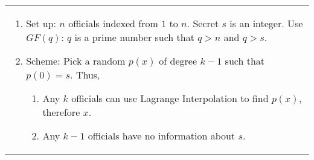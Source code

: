 {\tabulinesep=1mm
\begin{tabu}{|p{16cm} |}
\begin{enumerate} 
    \item Set up: $n$ officials indexed from $1$ to $n$. Secret $s$ is an integer. Use $GF(q)$: $q$ is a prime number such that $q > n$ and $q > s$. 
    \item Scheme: Pick a random $p(x)$ of degree $k-1$ such that $p(0) = s$. Thus, 
        \begin{enumerate}
            \item Any $k$ officials can use Lagrange Interpolation to find $p(x)$, therefore $x$. 
            \item Any $k-1$ officials have no information about $s$. 
	\end{enumerate}
\end{enumerate}
\end{tabu}
}

